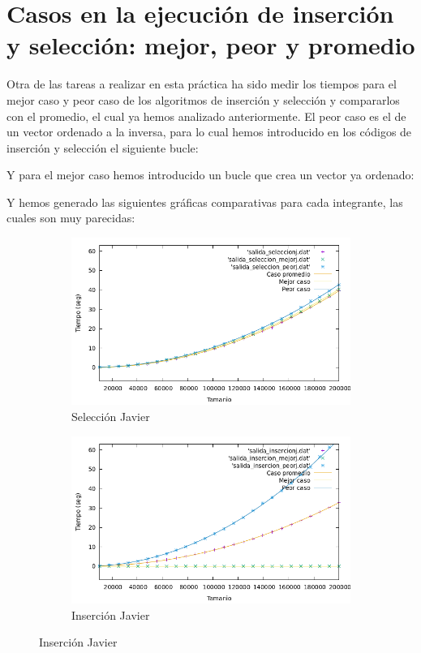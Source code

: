 \documentclass[10pt,a4paper]{article}
\begin{document}
\section{Casos en la ejecución de inserción y selección: mejor, peor y promedio}

Otra de las tareas a realizar en esta práctica ha sido medir los tiempos para el mejor caso y peor caso de los algoritmos de inserción y selección y compararlos con el promedio, el cual ya hemos analizado anteriormente. El peor caso es el de un vector ordenado a la inversa, para lo cual hemos introducido en los códigos de inserción y selección el siguiente bucle:



Y para el mejor caso hemos introducido un bucle que crea un vector ya ordenado:



Y hemos generado las siguientes gráficas comparativas para cada integrante, las cuales son muy parecidas:

\begin{figure}[h!]
	\begin{subfigure}{.5\textwidth}
		\centering
		\includegraphics[scale=0.3]{../../Images/Gráfica casos selección Javi5454.png}
		\caption{Selección Javier}
	\end{subfigure}
	\hfill
	\begin{subfigure}{.5\textwidth}
		\centering
		\includegraphics[scale=0.3]{../../Images/Gráfica inserción casos Javi5454.png}
		\caption{Inserción Javier}
	\end{subfigure}
\end{figure}
\end{document}
